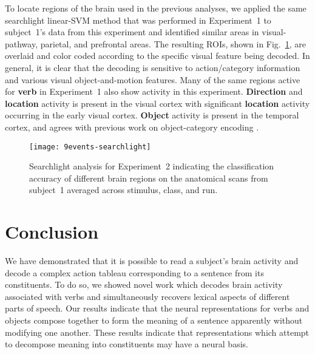 To locate regions of the brain used in the previous analyses, we applied the
same searchlight linear-SVM method that was performed in Experiment~1 to
subject~1's data from this experiment and identified similar areas in
visual-pathway, parietal, and prefrontal areas.
%
The resulting ROIs, shown in Fig.~\ref{fig:9events-searchlight}, are overlaid
and color coded according to the specific visual feature being decoded.
%
In general, it is clear that the decoding is sensitive to action/category
information and various visual object-and-motion features.
%
Many of the same regions active for \textbf{verb} in Experiment~1 also
show activity in this experiment.
%
\textbf{Direction} and \textbf{location} activity is present in the visual
cortex with significant \textbf{location} activity occurring in the early
visual cortex.
%
\textbf{Object} activity is present in the temporal cortex, and agrees with
previous work on object-category encoding \citep{Gazzaniga2008}.

\begin{figure}[t]
  \begin{center}
    \texttt{[image: 9events-searchlight]}
  \end{center}
  \caption{Searchlight analysis for Experiment~2 indicating the classification
    accuracy of different brain regions on the anatomical scans from subject~1
    averaged across stimulus, class, and run.}
  \label{fig:9events-searchlight}
\end{figure}

\section{Conclusion}
\label{sec:conclusion}

%
We have demonstrated that it is possible to read a subject's brain activity and
decode a complex action tableau corresponding to a sentence from its
constituents.
%
To do so, we showed novel work which decodes brain activity associated with
verbs and simultaneously recovers lexical aspects of different parts of speech.
%
Our results indicate that the neural representations for verbs and objects
compose together to form the meaning of a sentence apparently without modifying
one another.
%
These results indicate that representations which attempt to decompose meaning
into constituents may have a neural basis.
